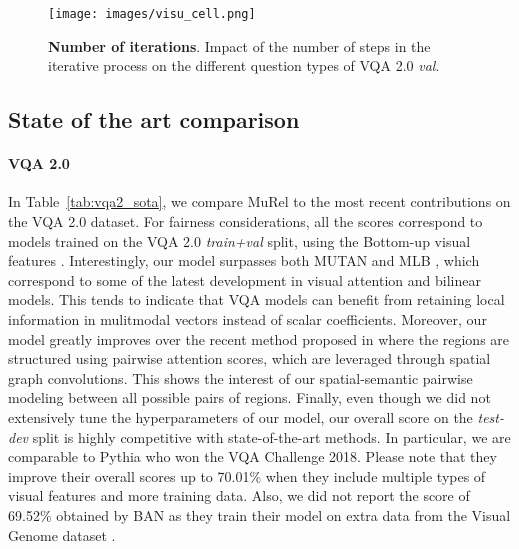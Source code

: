 \documentclass[10pt,twocolumn,letterpaper]{article}
\begin{document}
\begin{figure}
    \centering
    \texttt{[image: images/visu\_cell.png]}
    \caption{\label{fig:impact_nb_cell} \textbf{Number of iterations}. Impact of the number of steps in the iterative process on the different question types of VQA 2.0 \textit{val}.}
\end{figure}


\subsection{State of the art comparison}

\paragraph{VQA 2.0}
In Table~\ref{tab:vqa2_sota}, we compare MuRel to the most recent contributions on the VQA 2.0 dataset. For fairness considerations, all the scores correspond to models trained on the VQA 2.0 \textit{train+val} split, using the Bottom-up visual features \cite{Anderson_2018_CVPR}. 
Interestingly, our model surpasses both MUTAN \cite{benyounescadene2017mutan} and MLB \cite{Kim2017}, which correspond to some of the latest development in visual attention and bilinear models. This tends to indicate that VQA models can benefit from retaining local information in mulitmodal vectors instead of scalar coefficients. 
Moreover, our model greatly improves over the recent method proposed in \cite{learningconditionedgraph} where the regions are structured using pairwise attention scores, which are leveraged through spatial graph convolutions. This shows the interest of our spatial-semantic pairwise modeling between all possible pairs of regions.
Finally, even though we did not extensively tune the hyperparameters of our model, our overall score on the \textit{test-dev} split is highly competitive with state-of-the-art methods. In particular, we are comparable to Pythia \cite{pythia18arxiv} who won the VQA Challenge 2018. Please note that they improve their overall scores up to 70.01\% when they include multiple types of visual features and more training data. Also, we did not report the score of 69.52\% obtained by BAN \cite{Kim2018} as they train their model on extra data from the Visual Genome dataset \cite{Krishna_2017_IJCV}.
\end{document}

